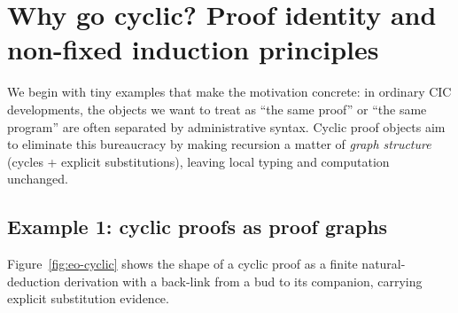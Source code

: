 \section{Why go cyclic? Proof identity and non-fixed induction principles}
\label{sec:why-cyclic}

We begin with tiny examples that make the motivation concrete: in ordinary CIC developments, the objects we want to treat as ``the same proof'' or ``the same program'' are often separated by administrative syntax.
Cyclic proof objects aim to eliminate this bureaucracy by making recursion a matter of \emph{graph structure} (cycles + explicit substitutions), leaving local typing and computation unchanged.

\subsection{Example 1: cyclic proofs as proof graphs}

Figure~\ref{fig:eo-cyclic} shows the shape of a cyclic proof as a finite natural-deduction derivation with a back-link from a bud to its companion, carrying explicit substitution evidence.

